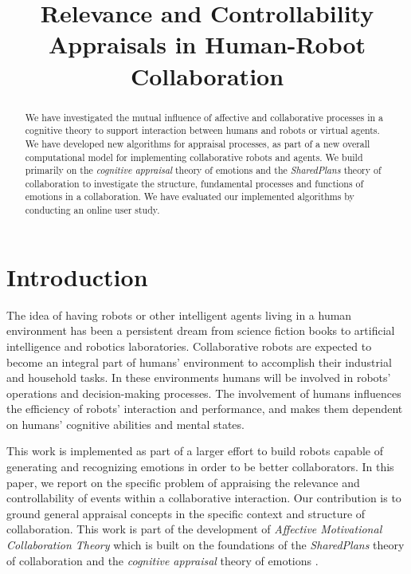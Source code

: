 \documentclass{article}
\title{Relevance and Controllability Appraisals in Human-Robot Collaboration}
\begin{document}
\maketitle

\vspace*{-5mm}
\begin{abstract}
\vspace*{-1mm}
We have investigated the mutual influence of affective and collaborative
processes in a cognitive theory to support interaction between humans and robots
or virtual agents. We have developed new algorithms for appraisal processes, as
part of a new overall computational model for implementing collaborative robots
and agents. We build primarily on the \textit{cognitive appraisal} theory of
emotions and the \textit{SharedPlans} theory of collaboration to investigate the
structure, fundamental processes and functions of emotions in a collaboration.
We have evaluated our implemented algorithms by conducting an online user study.
\end{abstract}

\vspace*{-6mm}
\section{Introduction}
\vspace*{-1mm}
The idea of having robots or other intelligent agents living in a human
environment has been a persistent dream from science fiction books to artificial
intelligence and robotics laboratories. Collaborative robots are expected to
become an integral part of humans' environment to accomplish their industrial
and household tasks. In these environments humans will be involved in robots'
operations and decision-making processes. The involvement of humans influences
the efficiency of robots' interaction and performance, and makes them dependent
on humans' cognitive abilities and mental states.

This work is implemented as part of a larger effort to build robots capable of
generating and recognizing emotions in order to be better collaborators. In this
paper, we report on the specific problem of appraising the relevance and
controllability of events within a collaborative interaction. Our contribution
is to ground general appraisal concepts in the specific context and structure of
collaboration. This work is part of the development of \textit{Affective
Motivational Collaboration Theory} which is built on the foundations of the
\textit{SharedPlans} theory of collaboration \cite{grosz:plans-discourse} and
the \textit{cognitive appraisal} theory of emotions
\cite{gratch:domain-independent}.
\end{document}
